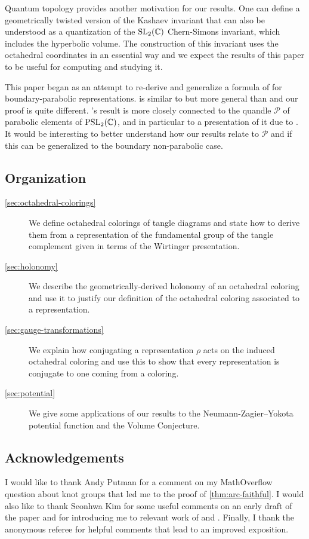\documentclass[leqno]{sl2art}
\begin{document}
Quantum topology provides another motivation for our results.
One can define \cite{McPhailSnyderThesis,McPhailSnyderVolume} a geometrically twisted version of the Kashaev invariant that can also be understood as a quantization of the \(\operatorname{SL}_2(\mathbb{C})\) Chern-Simons invariant, which includes the hyperbolic volume.
The construction of this invariant uses the octahedral coordinates in an essential way and we expect the results of this paper to be useful for computing and studying it.

This paper began as an attempt to re-derive and generalize a formula \cite[Theorem 3.2]{Cho2014} of \citeauthor{Cho2014} for boundary-parabolic representations.
 is similar to but more general than \cite[Theorem 3.2]{Cho2014} and our proof is quite different.
\citeauthor{Cho2014}'s result is more closely connected to the quandle \(\mathcal{P}\) of parabolic elements of \(\operatorname{PSL}_2(\mathbb{C})\), and in particular to a presentation of it due to \citeauthor{Inoue2014} \cite{Inoue2014}.
It would be interesting to better understand how our results relate to \(\mathcal{P}\) and if this can be generalized to the boundary non-parabolic case.

\subsection*{Organization}
\begin{description}
  \item[\cref{sec:octahedral-colorings}] We define octahedral colorings of tangle diagrams and state how to derive them from a representation of the fundamental group of the tangle complement given in terms of the Wirtinger presentation.
  \item[\cref{sec:holonomy}] We describe the geometrically-derived holonomy of an octahedral coloring and use it to justify our definition of the octahedral coloring associated to a representation.
  \item[\cref{sec:gauge-transformations}] We explain how conjugating a representation \(\rho\) acts on the induced octahedral coloring and use this to show that every representation is conjugate to one coming from a coloring.
  \item[\cref{sec:potential}] We give some applications of our results to the Neumann-Zagier--Yokota potential function and the Volume Conjecture.
\end{description}


\subsection*{Acknowledgements}
I would like to thank Andy Putman for a comment on my MathOverflow question \cite{MathoverflowMeridians} about knot groups that led me to the proof of \cref{thm:arc-faithful}.
I would also like to thank Seonhwa Kim for some useful comments on an early draft of the paper and for introducing me to relevant work of \textcite{Sakuma2018} and \textcite{Garoufalidis2016}.
Finally, I thank the anonymous referee for helpful comments that lead to an improved exposition.
\end{document}
